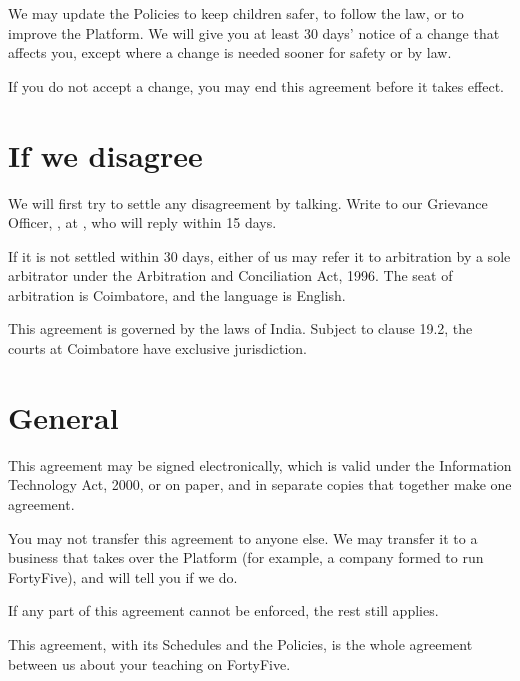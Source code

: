 \documentclass[11pt]{article}
\begin{document}
\begin{clauses}
  \item We may update the Policies to keep children safer, to follow the law, or to improve the Platform. We will give you at least 30 days' notice of a change that affects you, except where a change is needed sooner for safety or by law.
  \item If you do not accept a change, you may end this agreement before it takes effect.
\end{clauses}

\section{If we disagree}

\begin{clauses}
  \item We will first try to settle any disagreement by talking. Write to our Grievance Officer, , at , who will reply within 15 days.
  \item If it is not settled within 30 days, either of us may refer it to arbitration by a sole arbitrator under the Arbitration and Conciliation Act, 1996. The seat of arbitration is Coimbatore, and the language is English.
  \item This agreement is governed by the laws of India. Subject to clause 19.2, the courts at Coimbatore have exclusive jurisdiction.
\end{clauses}

\section{General}

\begin{clauses}
  \item This agreement may be signed electronically, which is valid under the Information Technology Act, 2000, or on paper, and in separate copies that together make one agreement.
  \item You may not transfer this agreement to anyone else. We may transfer it to a business that takes over the Platform (for example, a company formed to run FortyFive), and will tell you if we do.
  \item If any part of this agreement cannot be enforced, the rest still applies.
  \item This agreement, with its Schedules and the Policies, is the whole agreement between us about your teaching on FortyFive.
\end{clauses}
\end{document}
